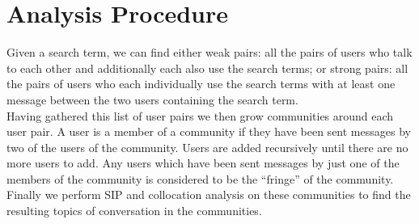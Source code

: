 \section{Analysis Procedure}
Given a search term, we can find either weak pairs: all the pairs of users who talk to each other and additionally each also use the search terms; or strong pairs: all the pairs of users who each individually use the search terms with at least one message between the two users containing the search term.\\
Having gathered this list of user pairs we then grow communities around each user pair.  A user is a member of a community if they have been sent messages by two of the users of the community. Users are added recursively until there are no more users to add.  Any users which have been sent messages by just one of the members of the community is considered to be the ``fringe'' of the community.\\
Finally we perform SIP and collocation analysis on these communities to find the resulting topics of conversation in the communities.\\